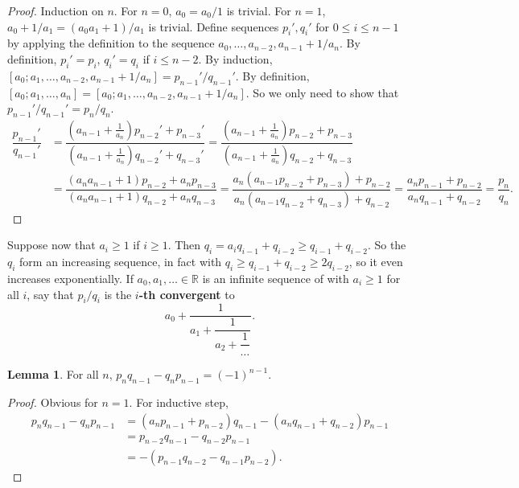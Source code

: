 \documentclass{article}
\newcommand{\R}{\mathbb{R}}
\newcommand{\rb}[1]{\left( #1 \right)}
\renewcommand{\sb}[1]{\left[ #1 \right]}
\theoremstyle{definition}\newtheorem{definition}{Definition}
\theoremstyle{definition}\newtheorem{remark}[definition]{Remark}
\theoremstyle{definition}\newtheorem*{example}{Example}
\theoremstyle{definition}\newtheorem*{note}{Note}
\newtheorem{lemma}[definition]{Lemma}
\begin{document}
\begin{proof}
Induction on $ n $. For $ n = 0 $, $ a_0 = a_0 / 1 $ is trivial. For $ n = 1 $, $ a_0 + 1 / a_1 = \rb{a_0a_1 + 1} / a_1 $ is trivial. Define sequences $ p_i', q_i' $ for $ 0 \le i \le n - 1 $ by applying the definition to the sequence $ a_0, \dots, a_{n - 2}, a_{n - 1} + 1 / a_n $. By definition, $ p_i' = p_i $, $ q_i' = q_i $ if $ i \le n - 2 $. By induction, $ \sb{a_0; a_1, \dots, a_{n - 2}, a_{n - 1} + 1 / a_n} = p_{n - 1}' / q_{n - 1}' $. By definition, $ \sb{a_0; a_1, \dots, a_n} = \sb{a_0; a_1, \dots, a_{n - 2}, a_{n - 1} + 1 / a_n} $. So we only need to show that $ p_{n - 1}' / q_{n - 1}' = p_n / q_n $.
\begin{align*}
\dfrac{p_{n - 1}'}{q_{n - 1}'}
& = \dfrac{\rb{a_{n - 1} + \tfrac{1}{a_n}}p_{n - 2}' + p_{n - 3}'}{\rb{a_{n - 1} + \tfrac{1}{a_n}}q_{n - 2}' + q_{n - 3}'}
= \dfrac{\rb{a_{n - 1} + \tfrac{1}{a_n}}p_{n - 2} + p_{n - 3}}{\rb{a_{n - 1} + \tfrac{1}{a_n}}q_{n - 2} + q_{n - 3}} \\
& = \dfrac{\rb{a_na_{n - 1} + 1}p_{n - 2} + a_np_{n - 3}}{\rb{a_na_{n - 1} + 1}q_{n - 2} + a_nq_{n - 3}}
= \dfrac{a_n\rb{a_{n - 1}p_{n - 2} + p_{n - 3}} + p_{n - 2}}{a_n\rb{a_{n - 1}q_{n - 2} + q_{n - 3}} + q_{n - 2}}
= \dfrac{a_np_{n - 1} + p_{n - 2}}{a_nq_{n - 1} + q_{n - 2}}
= \dfrac{p_n}{q_n}.
\end{align*}
\end{proof}

Suppose now that $ a_i \ge 1 $ if $ i \ge 1 $. Then $ q_i = a_iq_{i - 1} + q_{i - 2} \ge q_{i - 1} + q_{i - 2} $. So the $ q_i $ form an increasing sequence, in fact with $ q_i \ge q_{i - 1} + q_{i - 2} \ge 2q_{i - 2} $, so it even increases exponentially. If $ a_0, a_1, \dots \in \R $ is an infinite sequence of with $ a_i \ge 1 $ for all $ i $, say that $ p_i / q_i $ is the \textbf{$ i $-th convergent} to
$$ a_0 + \dfrac{1}{a_1 + \dfrac{1}{a_2 + \dfrac{1}{\dots}}}. $$

\begin{lemma}
\label{lem:69}
For all $ n $, $ p_nq_{n - 1} - q_np_{n - 1} = \rb{-1}^{n - 1} $.
\end{lemma}

\begin{proof}
Obvious for $ n = 1 $. For inductive step,
\begin{align*}
p_nq_{n - 1} - q_np_{n - 1}
& = \rb{a_np_{n - 1} + p_{n - 2}}q_{n - 1} - \rb{a_nq_{n - 1} + q_{n - 2}}p_{n - 1} \\
& = p_{n - 2}q_{n - 1} - q_{n - 2}p_{n - 1} \\
& = -\rb{p_{n - 1}q_{n - 2} - q_{n - 1}p_{n - 2}}.
\end{align*}
\end{proof}
\end{document}
